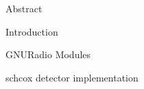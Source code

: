 




\usepackage{antropy_en}


  

  \begin{topchapter}{Abstract}
    
  \end{topchapter}

  \begin{topchapter}{Introduction}
    
  \end{topchapter}

  \begin{topchapter}{GNURadio Modules}
    
  \end{topchapter}

  \begin{topchapter}{\acrlong{schcox} detector implementation}
    
  \end{topchapter}

  \newpage
  \printglossaries
  \printbibliography

